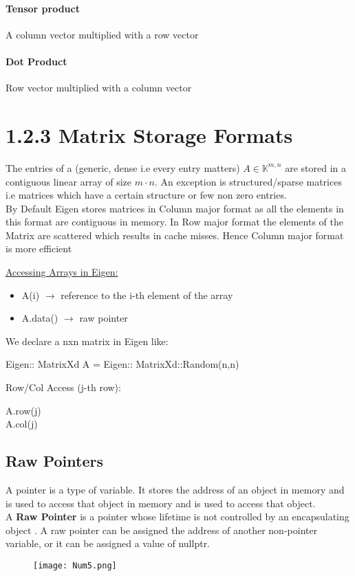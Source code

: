 \documentclass[8pt]{extreport}
\begin{document}
\paragraph{Tensor product} A column vector multiplied with a row vector
\paragraph{Dot Product} Row vector multiplied with a column vector

\section{1.2.3 Matrix Storage Formats}

The entries of a (generic, dense i.e every entry matters) $A \in \mathbb{K}^{m,n}$ are stored in a contiguous linear array of size $m \cdot n$. An exception is structured/sparse matrices i.e matrices which have a certain structure or few non zero entries. \\

By Default Eigen stores matrices in Column major format as all the elements in this format are contiguous in memory. In Row major format the elements of the Matrix are scattered which results in cache misses. Hence Column major format is more efficient  

\underline{Accessing Arrays in Eigen:} 
\begin{itemize}
\item A(i) $\rightarrow$  reference to the i-th element of the array
\item A.data() $\rightarrow$ raw pointer
\end{itemize} 

We declare a nxn matrix in Eigen like:

\begin{center}
Eigen:: MatrixXd A = Eigen:: MatrixXd::Random(n,n)
\end{center}

Row/Col Access (j-th row):
\begin{center}
A.row(j)\\
A.col(j)
\end{center}


\subsection{Raw Pointers}

A pointer is a type of variable. It stores the address of an object in memory and is used to access that object in memory and is used to access that object.\\
A \textbf{Raw Pointer} is a pointer whose lifetime is not controlled by an encapsulating object . A raw pointer can be assigned the address of another non-pointer variable, or it can be assigned a value of nullptr.
\begin{figure}[H]
\centering
\texttt{[image: Num5.png]}
\end{figure}
\end{document}
